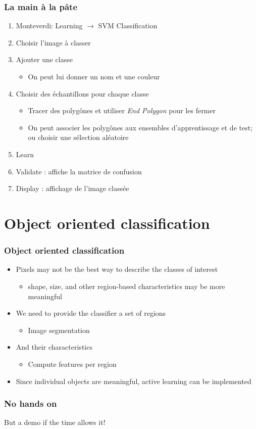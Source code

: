 \documentclass[compress]{beamer}
\begin{document}
\begin{frame}
  \frametitle{La main à la pâte}
  \begin{enumerate}
  \item Monteverdi: Learning $\rightarrow$ SVM Classification
  \item Choisir l'image à classer
  \item Ajouter une classe
    \begin{itemize}
    \item On peut lui donner un nom et une couleur
    \end{itemize}
  \item Choisir des échantillons pour chaque classe
    \begin{itemize}
    \item Tracer des polygônes et utiliser {\em End Polygon} pour les fermer
    \item On peut associer les polygônes aux ensembles d'apprentissage
      et de test; ou choisir une sélection aléatoire
    \end{itemize}
  \item Learn
  \item Validate : affiche la matrice de confusion
  \item Display : affichage de l'image classée
  \end{enumerate}    
\end{frame}

\section[Object oriented]{Object oriented classification}
\label{sec:objectoriented}
\begin{frame}
  \frametitle{Object oriented classification}
  \begin{itemize}
  \item Pixels may not be the best way to describe the classes of interest
    \begin{itemize}
    \item shape, size, and other region-based characteristics may be
      more meaningful
    \end{itemize}
  \item We need to provide the classifier a set of regions
    \begin{itemize}
    \item Image segmentation
    \end{itemize}
  \item And their characteristics
    \begin{itemize}
    \item Compute features per region 
    \end{itemize}
  \item Since individual objects are meaningful, active learning can
    be implemented
  \end{itemize}
\end{frame}

\begin{frame}
  \frametitle{No hands on}
But a demo if the time allows it!
\end{frame}
\end{document}
